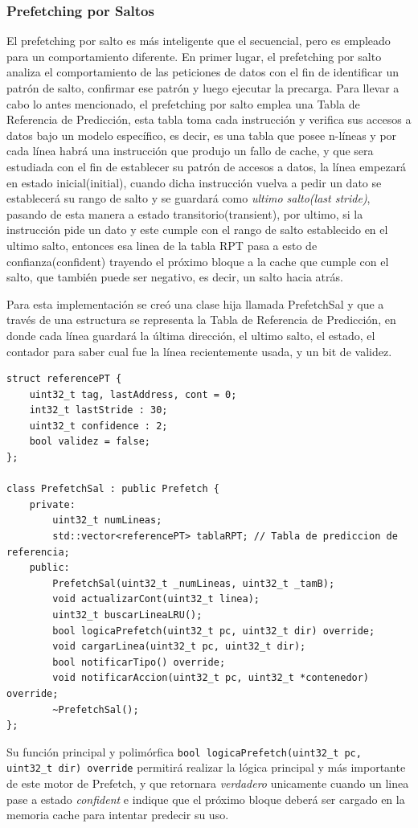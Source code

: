 \documentclass[12pt, a4paper]{article}
\begin{document}
\subsubsection{Prefetching por Saltos}
El prefetching por salto es más inteligente que el secuencial, pero es empleado para un comportamiento diferente. En primer lugar, el prefetching por salto analiza el comportamiento de las peticiones de datos con el fin de identificar un patrón de salto, confirmar ese patrón y luego ejecutar la precarga. Para llevar a cabo lo antes mencionado, el prefetching por salto emplea una Tabla de Referencia de Predicción, esta tabla toma cada instrucción y verifica sus accesos a datos bajo un modelo específico, es decir, es una tabla que posee n-líneas y por cada línea habrá una instrucción que produjo un fallo de cache, y que sera estudiada con el fin de establecer su patrón de accesos a datos, la línea empezará en estado inicial(initial), cuando dicha instrucción vuelva a pedir un dato se establecerá su rango de salto y se guardará como \textit{ultimo salto(last stride)}, pasando de esta manera a estado transitorio(transient), por ultimo, si la instrucción pide un dato y este cumple con el rango de salto establecido en el ultimo salto, entonces esa linea de la tabla RPT pasa a esto de confianza(confident) trayendo el próximo bloque a la cache que cumple con el salto, que también puede ser negativo, es decir, un salto hacia atrás.

Para esta implementación se creó una clase hija llamada PrefetchSal y que a través de una estructura se representa la Tabla de Referencia de Predicción, en donde cada línea guardará la última dirección, el ultimo salto, el estado, el contador para saber cual fue la línea recientemente usada, y un bit de validez. 

\begin{lstlisting}
struct referencePT {
    uint32_t tag, lastAddress, cont = 0;
    int32_t lastStride : 30;
    uint32_t confidence : 2;
    bool validez = false;
};

class PrefetchSal : public Prefetch {
    private:
        uint32_t numLineas;
        std::vector<referencePT> tablaRPT; // Tabla de prediccion de referencia;
    public:
        PrefetchSal(uint32_t _numLineas, uint32_t _tamB);
        void actualizarCont(uint32_t linea);
        uint32_t buscarLineaLRU();
        bool logicaPrefetch(uint32_t pc, uint32_t dir) override;
        void cargarLinea(uint32_t pc, uint32_t dir);
        bool notificarTipo() override;
        void notificarAccion(uint32_t pc, uint32_t *contenedor) override;
        ~PrefetchSal();
};
\end{lstlisting}
Su función principal y polimórfica \lstinline|bool logicaPrefetch(uint32_t pc, uint32_t dir) override| permitirá realizar la lógica principal y más importante de este motor de Prefetch, y que retornara \textit{verdadero} unicamente cuando un linea pase a estado \textit{confident} e indique que el próximo bloque deberá ser cargado en la memoria cache para intentar predecir su uso.
\end{document}
